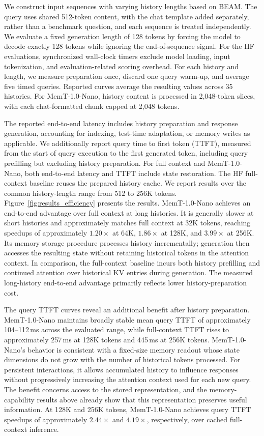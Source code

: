 We construct input sequences with varying history lengths based on BEAM.
The query uses shared 512-token content, with the chat template added separately, rather than a benchmark question, and each sequence is treated independently.
We evaluate a fixed generation length of 128 tokens by forcing the model to decode exactly 128 tokens while ignoring the end-of-sequence signal.
For the HF evaluations, synchronized wall-clock timers exclude model loading, input tokenization, and evaluation-related scoring overhead.
For each history and length, we measure preparation once, discard one query warm-up, and average five timed queries. Reported curves average the resulting values across 35 histories.
For MemT-1.0-Nano, history content is processed in 2,048-token slices, with each chat-formatted chunk capped at 2,048 tokens.

The reported end-to-end latency includes history preparation and response generation, accounting for indexing, test-time adaptation, or memory writes as applicable.
We additionally report query time to first token (TTFT), measured from the start of query execution to the first generated token, including query prefilling but excluding history preparation.
For full context and MemT-1.0-Nano, both end-to-end latency and TTFT include state restoration.
The HF full-context baseline reuses the prepared history cache.
We report results over the common history-length range from 512 to 256K tokens.
Figure~\ref{fig:results_efficiency} presents the results.
MemT-1.0-Nano achieves an end-to-end advantage over full context at long histories.
It is generally slower at short histories and approximately matches full context at 32K tokens, reaching speedups of approximately $1.20\times$ at 64K, $1.86\times$ at 128K, and $3.99\times$ at 256K.
Its memory storage procedure processes history incrementally; generation then accesses the resulting state without retaining historical tokens in the attention context.
In comparison, the full-context baseline incurs both history prefilling and continued attention over historical KV entries during generation.
The measured long-history end-to-end advantage primarily reflects lower history-preparation cost.

The query TTFT curves reveal an additional benefit after history preparation.
MemT-1.0-Nano maintains broadly stable mean query TTFT of approximately 104--112\,ms across the evaluated range, while full-context TTFT rises to approximately 257\,ms at 128K tokens and 445\,ms at 256K tokens.
MemT-1.0-Nano's behavior is consistent with a fixed-size memory readout whose state dimensions do not grow with the number of historical tokens processed.
For persistent interactions, it allows accumulated history to influence responses without progressively increasing the attention context used for each new query.
The benefit concerns access to the stored representation, and the memory-capability results above already show that this representation preserves useful information.
At 128K and 256K tokens, MemT-1.0-Nano achieves query TTFT speedups of approximately $2.44\times$ and $4.19\times$, respectively, over cached full-context inference.

